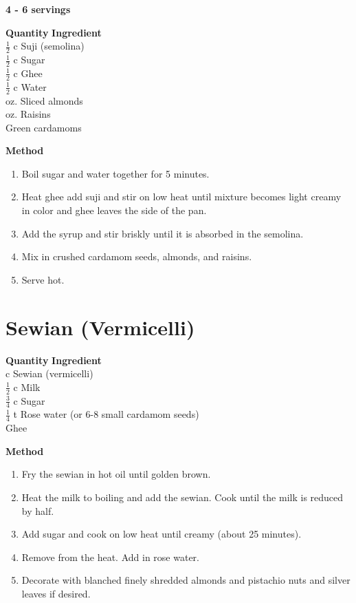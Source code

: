 {\bf 4 - 6 servings\\}
\begin{tabbing}
\hspace{1.0cm}  \={\bf Quantity}   \hspace{3.0cm} \={\bf Ingredient}\\
\>$\frac{1}{2}$ c \>Suji (semolina)\\
\>$\frac{1}{2}$ c \>Sugar\\
\>$\frac{1}{2}$ c  \>Ghee\\
 $\frac{1}{2}$ c \>Water\\
 oz. \>Sliced almonds\\
 oz. \>Raisins\\
 \>Green cardamoms\\
\end{tabbing}

{\bf Method}
\begin{enumerate}
\item Boil sugar and water together for 5 minutes.
\item Heat ghee add suji and stir on low heat until mixture becomes light
creamy in color and ghee leaves the side of the pan.
\item Add the syrup and stir briskly until it is absorbed in the semolina.
\item Mix in crushed cardamom seeds, almonds, and raisins.
\item Serve hot.
\end{enumerate}


\section{Sewian (Vermicelli)}

\begin{tabbing}
\hspace{1.0cm}  \={\bf Quantity}   \hspace{3.0cm} \={\bf Ingredient}\\

 c \>Sewian (vermicelli)\\
 $\frac{1}{2}$ c \>Milk\\
\>$\frac{3}{4}$ c \>Sugar\\
\>$\frac{1}{4}$ t \>Rose water (or 6-8 small cardamom seeds)\\
\>\>Ghee\\
\end{tabbing}

{\bf Method}
\begin{enumerate}
\item Fry the sewian in hot oil until golden brown.
\item Heat the milk to boiling and add the sewian. Cook until the milk is
reduced by half.
\item Add sugar and cook on low heat until creamy (about 25 minutes).
\item Remove from the heat. Add in rose water.  
\item Decorate with blanched finely 
shredded almonds and pistachio nuts and silver leaves if desired.
\end{enumerate}



